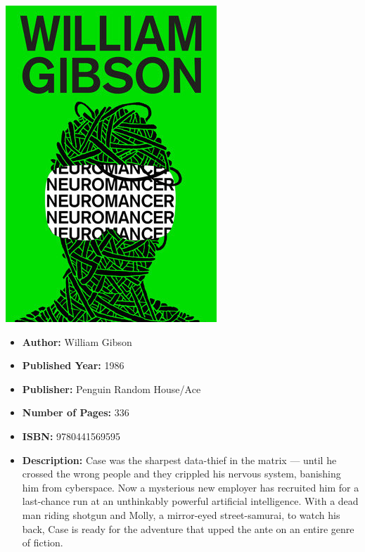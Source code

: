 \documentclass{tufte-handout}
\makeatletter
\newcommand{\varcaption}[2][0pt]{%
  \gsetlength{\@tufte@caption@vertical@offset}{-#1}%
  \gdef\@tufte@stored@varcaption{#2}%
}
\gdef\@tufte@stored@varcaption{} %
\makeatother
\begin{document}
\begin{marginfigure}[\baselineskip]
   \includegraphics[width=\linewidth]{images/neuromancer.jpg}
   \varcaption{\href{https://www.penguinrandomhouse.com/books/293994/neuromancer-by-william-gibson/9780441007462/}{Publisher Link}, \href{https://www.amazon.com/Neuromancer-William-Gibson/dp/0441569595/}{Amazon Link}}
\end{marginfigure}

\begin{itemize}
    \item[] \textbf{Author:} William Gibson
    \item[] \textbf{Published Year:} 1986
    \item[] \textbf{Publisher:} Penguin Random House/Ace
    \item[] \textbf{Number of Pages:} 336 
    \item[] \textbf{ISBN:} 9780441569595
    \item[] \textbf{Description:} Case was the sharpest data-thief in the matrix --- until he crossed the wrong people and they crippled his nervous system, banishing him from cyberspace. Now a mysterious new employer has recruited him for a last-chance run at an unthinkably powerful artificial intelligence. With a dead man riding shotgun and Molly, a mirror-eyed street-samurai, to watch his back, Case is ready for the adventure that upped the ante on an entire genre of fiction.
\end{itemize}
\end{document}
